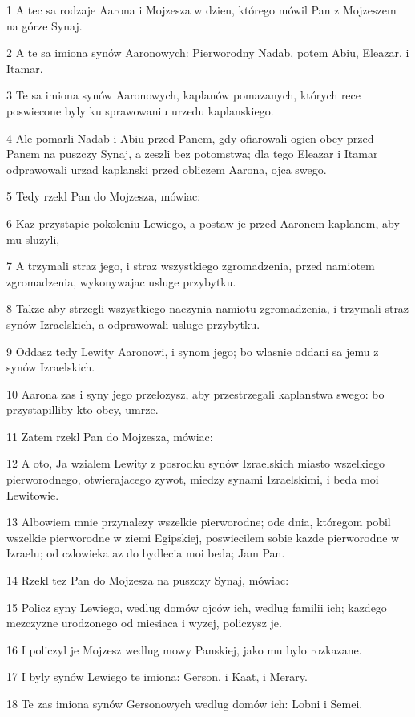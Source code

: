 \par 1 A tec sa rodzaje Aarona i Mojzesza w dzien, którego mówil Pan z Mojzeszem na górze Synaj.
\par 2 A te sa imiona synów Aaronowych: Pierworodny Nadab, potem Abiu, Eleazar, i Itamar.
\par 3 Te sa imiona synów Aaronowych, kaplanów pomazanych, których rece poswiecone byly ku sprawowaniu urzedu kaplanskiego.
\par 4 Ale pomarli Nadab i Abiu przed Panem, gdy ofiarowali ogien obcy przed Panem na puszczy Synaj, a zeszli bez potomstwa; dla tego Eleazar i Itamar odprawowali urzad kaplanski przed obliczem Aarona, ojca swego.
\par 5 Tedy rzekl Pan do Mojzesza, mówiac:
\par 6 Kaz przystapic pokoleniu Lewiego, a postaw je przed Aaronem kaplanem, aby mu sluzyli,
\par 7 A trzymali straz jego, i straz wszystkiego zgromadzenia, przed namiotem zgromadzenia, wykonywajac usluge przybytku.
\par 8 Takze aby strzegli wszystkiego naczynia namiotu zgromadzenia, i trzymali straz synów Izraelskich, a odprawowali usluge przybytku.
\par 9 Oddasz tedy Lewity Aaronowi, i synom jego; bo wlasnie oddani sa jemu z synów Izraelskich.
\par 10 Aarona zas i syny jego przelozysz, aby przestrzegali kaplanstwa swego: bo przystapilliby kto obcy, umrze.
\par 11 Zatem rzekl Pan do Mojzesza, mówiac:
\par 12 A oto, Ja wzialem Lewity z posrodku synów Izraelskich miasto wszelkiego pierworodnego, otwierajacego zywot, miedzy synami Izraelskimi, i beda moi Lewitowie.
\par 13 Albowiem mnie przynalezy wszelkie pierworodne; ode dnia, któregom pobil wszelkie pierworodne w ziemi Egipskiej, poswiecilem sobie kazde pierworodne w Izraelu; od czlowieka az do bydlecia moi beda; Jam Pan.
\par 14 Rzekl tez Pan do Mojzesza na puszczy Synaj, mówiac:
\par 15 Policz syny Lewiego, wedlug domów ojców ich, wedlug familii ich; kazdego mezczyzne urodzonego od miesiaca i wyzej, policzysz je.
\par 16 I policzyl je Mojzesz wedlug mowy Panskiej, jako mu bylo rozkazane.
\par 17 I byly synów Lewiego te imiona: Gerson, i Kaat, i Merary.
\par 18 Te zas imiona synów Gersonowych wedlug domów ich: Lobni i Semei.
